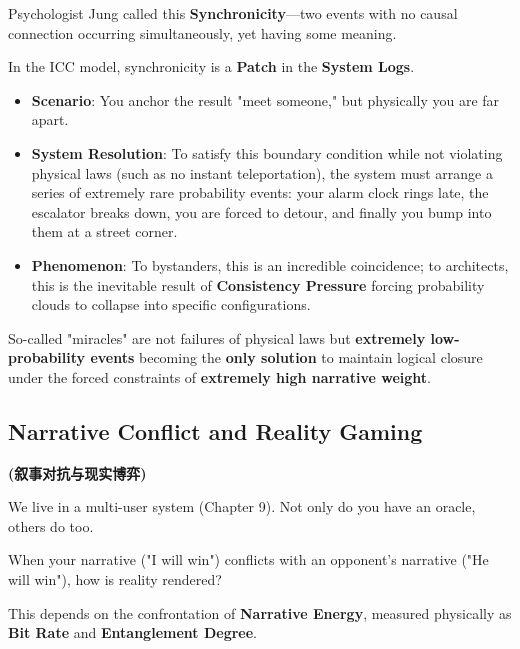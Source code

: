 Psychologist Jung called this \textbf{Synchronicity}—two events with no causal connection occurring simultaneously, yet having some meaning.

In the ICC model, synchronicity is a \textbf{Patch} in the \textbf{System Logs}.

\begin{itemize}
\item \textbf{Scenario}: You anchor the result "meet someone," but physically you are far apart.

\item \textbf{System Resolution}: To satisfy this boundary condition while not violating physical laws (such as no instant teleportation), the system must arrange a series of extremely rare probability events: your alarm clock rings late, the escalator breaks down, you are forced to detour, and finally you bump into them at a street corner.

\item \textbf{Phenomenon}: To bystanders, this is an incredible coincidence; to architects, this is the inevitable result of \textbf{Consistency Pressure} forcing probability clouds to collapse into specific configurations.
\end{itemize}

\begin{corollary}
So-called "miracles" are not failures of physical laws but \textbf{extremely low-probability events} becoming the \textbf{only solution} to maintain logical closure under the forced constraints of \textbf{extremely high narrative weight}.
\end{corollary}

\subsection{Narrative Conflict and Reality Gaming}

\textbf{(叙事对抗与现实博弈)}

We live in a multi-user system (Chapter 9). Not only do you have an oracle, others do too.

When your narrative ("I will win") conflicts with an opponent's narrative ("He will win"), how is reality rendered?

This depends on the confrontation of \textbf{Narrative Energy}, measured physically as \textbf{Bit Rate} and \textbf{Entanglement Degree}.

